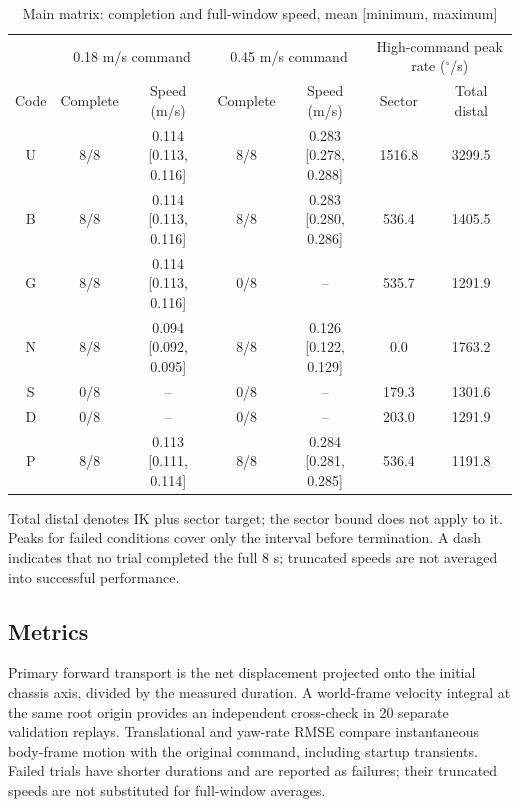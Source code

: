 \documentclass[letterpaper,10pt,conference]{ieeeconf}
\begin{document}
\begin{table}[t]\centering\small
\caption{Main matrix: completion and full-window speed, mean [minimum, maximum]}
\label{tab:main}
\begin{tabular}{ccccccc}\toprule
 & \multicolumn{2}{c}{0.18 m/s command} & \multicolumn{2}{c}{0.45 m/s command} & \multicolumn{2}{c}{High-command peak rate ($^\circ$/s)}\\
Code & Complete & Speed (m/s) & Complete & Speed (m/s) & Sector & Total distal\\\midrule
U & 8/8 & 0.114 [0.113, 0.116] & 8/8 & 0.283 [0.278, 0.288] & 1516.8 & 3299.5\\
B & 8/8 & 0.114 [0.113, 0.116] & 8/8 & 0.283 [0.280, 0.286] & 536.4 & 1405.5\\
G & 8/8 & 0.114 [0.113, 0.116] & 0/8 & -- & 535.7 & 1291.9\\
N & 8/8 & 0.094 [0.092, 0.095] & 8/8 & 0.126 [0.122, 0.129] & 0.0 & 1763.2\\
S & 0/8 & -- & 0/8 & -- & 179.3 & 1301.6\\
D & 0/8 & -- & 0/8 & -- & 203.0 & 1291.9\\
P & 8/8 & 0.113 [0.111, 0.114] & 8/8 & 0.284 [0.281, 0.285] & 536.4 & 1191.8\\
\bottomrule\end{tabular}
\par\vspace{5pt}\noindent\parbox{.96\textwidth}{\footnotesize Total distal denotes IK plus sector target; the sector bound does not apply to it. Peaks for failed conditions cover only the interval before termination. A dash indicates that no trial completed the full 8 s; truncated speeds are not averaged into successful performance.}
\end{table}

\subsection{Metrics}
Primary forward transport is the net displacement projected onto the initial chassis axis, divided by the measured duration. A world-frame velocity integral at the same root origin provides an independent cross-check in 20 separate validation replays. Translational and yaw-rate RMSE compare instantaneous body-frame motion with the original command, including startup transients. Failed trials have shorter durations and are reported as failures; their truncated speeds are not substituted for full-window averages.
\end{document}
